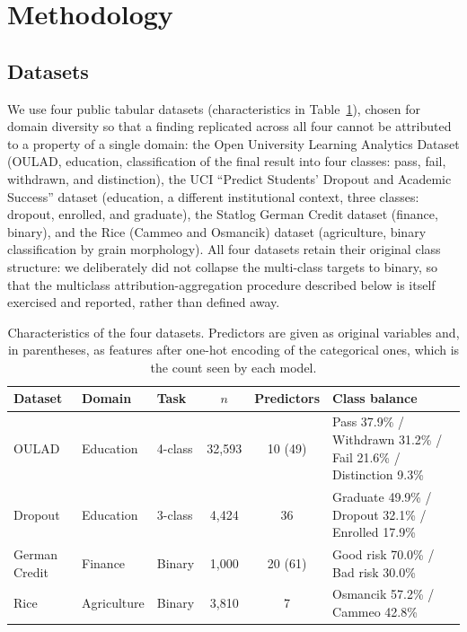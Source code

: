 \documentclass[11pt,twoside,a4paper]{article}
\begin{document}
\section{Methodology}


\subsection{Datasets}
We use four public tabular datasets (characteristics in Table~\ref{tab:datasets}), chosen for domain diversity so that a finding replicated across all four cannot be attributed to a property of a single domain: the Open University Learning Analytics Dataset (OULAD, education, classification of the final result into four classes: pass, fail, withdrawn, and distinction), the UCI ``Predict Students' Dropout and Academic Success'' dataset (education, a different institutional context, three classes: dropout, enrolled, and graduate), the Statlog German Credit dataset (finance, binary), and the Rice (Cammeo and Osmancik) dataset (agriculture, binary classification by grain morphology). All four datasets retain their original class structure: we deliberately did not collapse the multi-class targets to binary, so that the multiclass attribution-aggregation procedure described below is itself exercised and reported, rather than defined away.

\begin{table}[h]
\centering
\caption{Characteristics of the four datasets. Predictors are given as original variables and, in parentheses, as features after one-hot encoding of the categorical ones, which is the count seen by each model.}
\label{tab:datasets}
\small
\begin{tabular}{lllccp{5.2cm}}
\toprule
Dataset & Domain & Task & $n$ & Predictors & Class balance \\
\midrule
OULAD          & Education   & 4-class & 32{,}593 & 10 (49) & Pass 37.9\% / Withdrawn 31.2\% / Fail 21.6\% / Distinction 9.3\% \\
Dropout        & Education   & 3-class & 4{,}424  & 36 & Graduate 49.9\% / Dropout 32.1\% / Enrolled 17.9\% \\
German Credit  & Finance     & Binary  & 1{,}000  & 20 (61) & Good risk 70.0\% / Bad risk 30.0\% \\
Rice           & Agriculture & Binary  & 3{,}810  & 7  & Osmancik 57.2\% / Cammeo 42.8\% \\
\bottomrule
\end{tabular}
\end{table}
\end{document}
